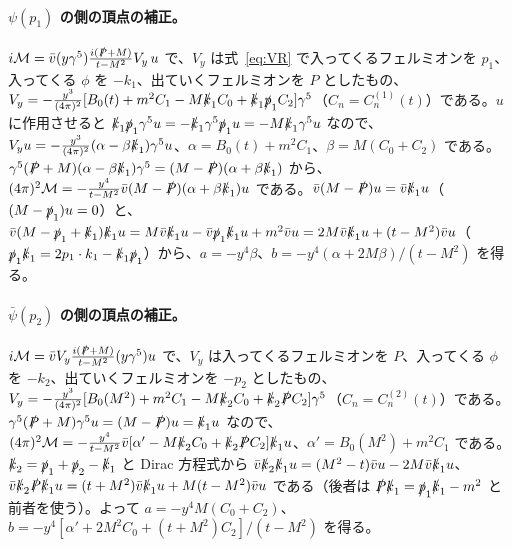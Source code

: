 \documentclass[a4paper,10pt]{ltjsarticle}
\begin{document}
\paragraph{$\psi(p_1)$ の側の頂点の補正。}$i\mathcal M=\bar v(y\gamma^5)\frac{i(\slashed P+M)}{t-M^2}V_y\,u$ で、$V_y$ は式~\eqref{eq:VR} で入ってくるフェルミオンを $p_1$、入ってくる $\phi$ を $-k_1$、出ていくフェルミオンを $P$ としたもの、$V_y=-\frac{y^3}{(4\pi)^2}[B_0(t)+m^2C_1-M\slashed k_1C_0+\slashed k_1\slashed p_1C_2]\gamma^5$（$C_n=C^{(1)}_n(t)$）である。$u$ に作用させると $\slashed k_1\slashed p_1\gamma^5u=-\slashed k_1\gamma^5\slashed p_1u=-M\slashed k_1\gamma^5u$ なので、$V_yu=-\frac{y^3}{(4\pi)^2}(\alpha-\beta\slashed k_1)\gamma^5u$、$\alpha=B_0(t)+m^2C_1$、$\beta=M(C_0+C_2)$ である。$\gamma^5(\slashed P+M)(\alpha-\beta\slashed k_1)\gamma^5=(M-\slashed P)(\alpha+\beta\slashed k_1)$ から、$(4\pi)^2\mathcal M=-\frac{y^4}{t-M^2}\bar v(M-\slashed P)(\alpha+\beta\slashed k_1)u$ である。$\bar v(M-\slashed P)u=\bar v\slashed k_1u$（$(M-\slashed p_1)u=0$）と、$\bar v(M-\slashed p_1+\slashed k_1)\slashed k_1u=M\bar v\slashed k_1u-\bar v\slashed p_1\slashed k_1u+m^2\bar vu=2M\bar v\slashed k_1u+(t-M^2)\bar vu$（$\slashed p_1\slashed k_1=2p_1\cdot k_1-\slashed k_1\slashed p_1$）から、$a=-y^4\beta$、$b=-y^4(\alpha+2M\beta)/(t-M^2)$ を得る。

\paragraph{$\bar\psi(p_2)$ の側の頂点の補正。}$i\mathcal M=\bar vV_y\frac{i(\slashed P+M)}{t-M^2}(y\gamma^5)u$ で、$V_y$ は入ってくるフェルミオンを $P$、入ってくる $\phi$ を $-k_2$、出ていくフェルミオンを $-p_2$ としたもの、$V_y=-\frac{y^3}{(4\pi)^2}[B_0(M^2)+m^2C_1-M\slashed k_2C_0+\slashed k_2\slashed PC_2]\gamma^5$（$C_n=C^{(2)}_n(t)$）である。$\gamma^5(\slashed P+M)\gamma^5u=(M-\slashed P)u=\slashed k_1u$ なので、$(4\pi)^2\mathcal M=-\frac{y^4}{t-M^2}\bar v[\alpha'-M\slashed k_2C_0+\slashed k_2\slashed PC_2]\slashed k_1u$、$\alpha'=B_0(M^2)+m^2C_1$ である。$\slashed k_2=\slashed p_1+\slashed p_2-\slashed k_1$ と Dirac 方程式から $\bar v\slashed k_2\slashed k_1u=(M^2-t)\bar vu-2M\bar v\slashed k_1u$、$\bar v\slashed k_2\slashed P\slashed k_1u=(t+M^2)\bar v\slashed k_1u+M(t-M^2)\bar vu$ である（後者は $\slashed P\slashed k_1=\slashed p_1\slashed k_1-m^2$ と前者を使う）。よって $a=-y^4M(C_0+C_2)$、$b=-y^4[\alpha'+2M^2C_0+(t+M^2)C_2]/(t-M^2)$ を得る。
\end{document}
